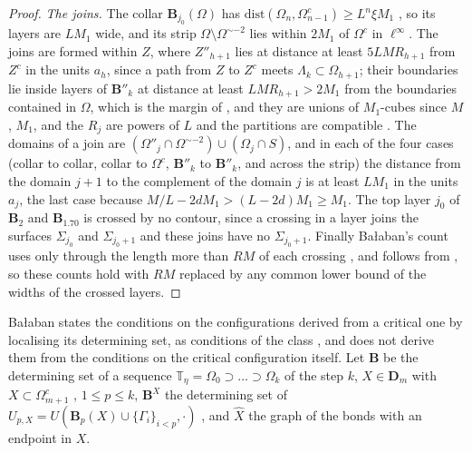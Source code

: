 \documentclass[11pt]{preprint}
\numberwithin{equation}{section}
\theoremstyle{definition}
\theoremstyle{remark}
\theoremstyle{plain}
\begin{document}
\begin{proof}
\emph{The joins.} The collar $\mathbf B_{j_0}(\Omega)$ has $\mathrm{dist}(\Omega_n, \Omega_{n-1}^c) \geq L^n\xi M_1$ \cite[p.~256, ll.~56--61]{BalabanCRE}, so its layers are $LM_1$ wide, and its strip $\Omega \setminus \Omega^{\sim-2}$ lies within $2M_1$ of $\Omega^c$ in $\ell^\infty$. The joins are formed within $Z$, where $Z''_{h+1}$ lies at distance at least $5LMR_{h+1}$ from $Z^c$ in the units $a_h$, since a path from $Z$ to $Z^c$ meets $\Lambda_k \subset \Omega_{h+1}$; their boundaries lie inside layers of $\mathbf B''_k$ at distance at least $LMR_{h+1} > 2M_1$ from the boundaries contained in $\Omega$, which is the margin of \cite[(2.14)]{BalabanCRE} \cite[p.~257, ll.~10--11]{BalabanCRE}, and they are unions of $M_1$-cubes since $M$, $M_1$, and the $R_j$ are powers of $L$ and the partitions are compatible \cite[p.~245, ll.~38--40]{BalabanCRE}. The domains of a join are $(\Omega''_j \cap \Omega^{\sim-2}) \cup (\Omega_j \cap S)$, and in each of the four cases (collar to collar, collar to $\Omega^c$, $\mathbf B''_k$ to $\mathbf B''_k$, and across the strip) the distance from the domain $j + 1$ to the complement of the domain $j$ is at least $LM_1$ in the units $a_j$, the last case because $M/L - 2dM_1 > (L - 2d)M_1 \geq M_1$. The top layer $j_0$ of $\mathbf B_2$ and $\mathbf B_{1.70}$ is crossed by no contour, since a crossing in a layer joins the surfaces $\Sigma_{j_0}$ and $\Sigma_{j_0+1}$ \cite[(2.47), p.~231]{BalabanPRT2} and these joins have no $\Sigma_{j_0+1}$. Finally Ba{\l}aban's count \cite[(2.58)]{BalabanPRT2} uses \cite[(2.2)]{BalabanPRT2} only through the length more than $RM$ of each crossing \cite[(2.57), p.~233]{BalabanPRT2}, and \cite[(2.60)]{BalabanPRT2} follows from \cite[(2.48), (2.57)]{BalabanPRT2}, so these counts hold with $RM$ replaced by any common lower bound of the widths of the crossed layers.
\end{proof}

Ba{\l}aban states the conditions \cite[(2.35), (2.37), p.~261, ll.~17--21]{BalabanCRE} on the configurations derived from a critical one by localising its determining set, as conditions of the class \cite[p.~190, ll.~20--31]{BalabanLFR1}, and does not derive them from the conditions \cite[(2.34), (2.36)]{BalabanCRE} on the critical configuration itself. Let $\mathbf B$ be the determining set of a sequence $\mathbb T_\eta = \Omega_0 \supset \dots \supset \Omega_k$ of the step $k$, $X \in \mathbf D_m$ with $X \subset \Omega_{m+1}^c$ \cite[(1.63), p.~189]{BalabanLFR1}, $1 \leq p \leq k$, $\mathbf B^X$ the determining set of $U_{p,X} = U(\mathbf B_p(X) \cup \{\Gamma_i\}_{i<p}, \cdot)$ \cite[p.~261, l.~10]{BalabanCRE}, and $\hat X$ the graph of the bonds with an endpoint in $X$.
\end{document}
